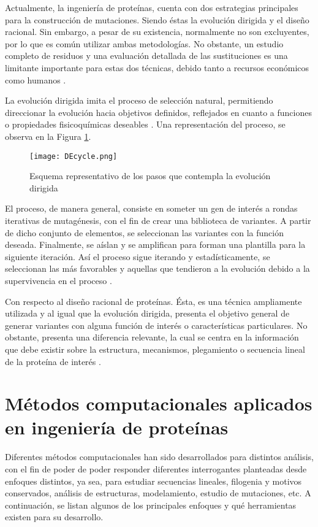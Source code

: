 Actualmente, la ingeniería de proteínas, cuenta con dos estrategias principales para la construcción de mutaciones. Siendo éstas la evolución dirigida y el diseño racional. Sin embargo, a pesar de su existencia, normalmente no son excluyentes, por lo que es común utilizar ambas metodologías. No obstante, un estudio completo de residuos y una evaluación detallada de las sustituciones es una limitante importante para estas dos técnicas, debido tanto a recursos económicos como humanos \cite{liszewski2015speeding}.

La evolución dirigida imita el proceso de selección natural, permitiendo direccionar la evolución hacia objetivos definidos, reflejados en cuanto a funciones o propiedades fisicoquímicas deseables \cite{lutz2010beyond, arnold1998design}. Una representación del proceso, se observa en la Figura \ref{ed}. 

\begin{figure}[!h]
	
	\centering
	\texttt{[image: DEcycle.png]}
	\caption{Esquema representativo de los pasos que contempla la evolución dirigida}
	\label{ed}
\end{figure}

El proceso, de manera general, consiste en someter un gen de interés a rondas iterativas de mutagénesis, con el fin de crear una biblioteca de variantes. A partir de dicho conjunto de elementos, se seleccionan las variantes con la función deseada. Finalmente, se aíslan y se amplifican para forman una plantilla para la siguiente iteración. Así el proceso sigue iterando y estadísticamente, se seleccionan las más favorables y aquellas que tendieron a la evolución debido a la supervivencia en el proceso \cite{arnold1998design}.

Con respecto al diseño racional de proteínas. Ésta, es una técnica ampliamente utilizada y al igual que la evolución dirigida, presenta el objetivo general de generar variantes con alguna función de interés o características particulares. No obstante, presenta una diferencia relevante, la cual se centra en la información que debe existir sobre la estructura, mecanismos, plegamiento o secuencia lineal de la proteína de interés \cite{carpenter1997rational}.

\section{Métodos computacionales aplicados en ingeniería de proteínas}

Diferentes métodos computacionales han sido desarrollados para distintos análisis, con el fin de poder de poder responder diferentes interrogantes planteadas desde enfoques distintos, ya sea, para estudiar secuencias lineales, filogenia y motivos conservados, análisis de estructuras, modelamiento, estudio de mutaciones, etc. A continuación, se listan algunos de los principales enfoques y qué herramientas existen para su desarrollo.

